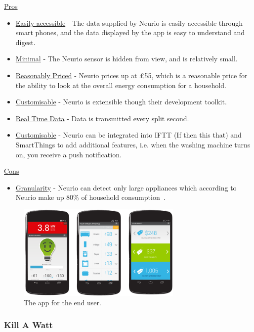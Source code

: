\documentclass[preprint,12pt,3p]{elsarticle}
\begin{document}
\begin{center}
\underline{Pros}
\begin{itemize}
        \item \underline{Easily accessible} - The data supplied by Neurio is easily accessible through smart phones, and the data displayed by the app is easy to understand and digest.
    \item \underline{Minimal} - The Neurio sensor is hidden from view, and is relatively small.
    \item \underline{Reasonably Priced} - Neurio prices up at \pounds55, which is a reasonable price for the ability to look at the overall energy consumption for a household. 
    \item \underline{Customisable} - Neurio is extensible though their development toolkit.
    \item \underline{Real Time Data} - Data is transmitted every split second.
    \item \underline{Customisable} - Neurio can be integrated into IFTT (If then this that) and SmartThings to add additional features, i.e. when the washing machine turns on, you receive a push notification.
\end{itemize}
    
\underline{Cons}
\begin{itemize}
    \item \underline{Granularity} - Neurio can detect only large appliances which according to Neurio make up 80\% of household consumption~\cite{neurioaccuracy}.

\end{itemize}
    
\end{center}

\begin{figure}[H]
    \centering
    \includegraphics[width=8cm]{existing/neurio-app}
    \caption {The app for the end user.}
\end{figure}


\subsubsection{Kill A Watt}
\end{document}
